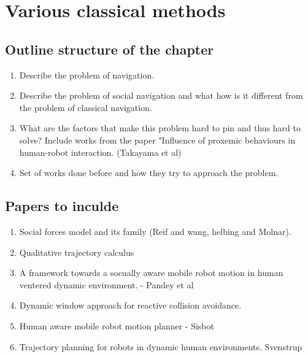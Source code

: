 \section{Various classical methods}

\subsection*{Outline structure of the chapter}
\begin{enumerate}
    \item Describe the problem of navigation.
    \item Describe the problem of social navigation and what how is it different from the problem of classical navigation.

    \item What are the factors that make this problem hard to pin and thus hard to solve? Include works from the paper "Influence of proxemic behaviours in human-robot interaction. (Takayama et al)
    \item Set of works done before and how they try to approach the problem.
\end{enumerate}

\subsection*{Papers to inculde}
    \begin{enumerate}
        \item Social forces model and its family (Reif and wang, helbing and Molnar).
        \item Qualitative trajectory calculus
        \item A framework towards a socually aware mobile robot motion in human ventered dynamic environment. - Pandey et al
        \item Dynamic window approach for reactive collision avoidance.
        \item Human aware mobile robot motion planner - Sisbot
        \item Trajectory planning for robots in dynamic human environments. Svenstrup
    \end{enumerate}



